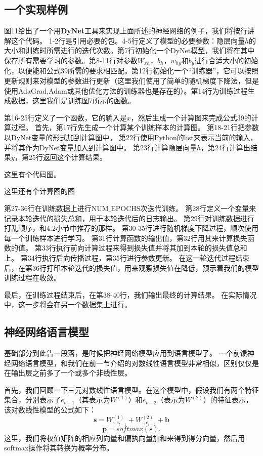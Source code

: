 \documentclass[10pt,a4paper]{ctexart}
\begin{document}
\subsection{一个实现样例}
图11给出了一个用\textbf{DyNet}工具来实现上面所述的神经网络的例子，我们将按行讲解这个代码。
1-2行是引用必要的包。4-5行定义了模型的必要参数：隐层向量\textbf{$h$}的大小和训练时所需进行的迭代次数。第7行初始化一个DyNet模型，我们将在其中保存所有需要学习的参数。第8-11行对参数$W_{xh}$，$b_h$，$w_{hy}$和$b_y$进行合适大小的初始化，以便能和公式39所需的要求相匹配。第12行初始化一个“训练器”，它可以按照更新规则来对模型的参数进行更新（这里我们使用了简单的随机梯度下降法，但是使用AdaGrad,Adam或其他优化方法的训练器也是存在的）。第14行为训练过程生成数据，这里我们是训练图7所示的函数。

第16-25行定义了一个函数，它的输入是\textbf{$x$}，然后生成一个计算图来完成公式39的计算过程。
首先，第17行先生成一个计算某个训练样本的计算图。
第18-21行把参数以DyNet变量的形式加到计算图中。
第22行使用Python的list来表示当前的输入，并将其作为DyNet变量加入到计算图中。
第23行计算隐层向量\textbf{$h$}，第24行计算出结果$y$，第25行返回这个计算结果。

这里有个代码图。

这里还有个计算图的图

第27-36行在训练数据上进行$\mathrm{NUM\_EPOCHS}$次迭代训练。
第28行定义一个变量来记录本轮迭代的损失总和，用于本轮迭代后的日志输出。
第29行对训练数据进行打乱顺序，和4.2小节中推荐的那样。
第30-35行进行随机梯度下降过程，顺次使用每一个训练样本进行学习。
第31行计算函数的输出值，第32行用其来计算损失函数的值。
第33行执行前向计算过程来得到损失值并将其加到本轮的损失值总和上。
第34行执行后向传播过程，第35行进行参数更新。
在这一轮迭代过程结束后，在第36行打印本轮迭代的损失值，用来观察损失值在降低，预示着我们的模型训练过程在收敛。

最后，在训练过程结束后，在第38-40行，我们输出最终的计算结果。
在实际情况中，这一步将会在另一个数据集上进行。

\subsection{神经网络语言模型}
基础部分到此告一段落，是时候把神经网络模型应用到语言模型了。
一个前馈神经网络语言模型，和我们在前一节介绍的对数线性语言模型非常相似，区别仅仅是在输出层之前多了一个或多个非线性层。

首先，我们回顾一下三元对数线性语言模型。在这个模型中，假设我们有两个特征集合，分别表示了$e_{t-1}$（其表示为$W^{(1)}$）和$e_{t-2}$（表示为$W^{(2)}$）的特征表示，该对数线性模型的公式如下：
\[
 \textbf{s} = W_{\cdot,e_{t-1}}^{(1)} + W_{\cdot,e_{t-2}}^{(2)} + \textbf{b}
\]
\[
 \textbf{p} = softmax( \textbf{s} ).
\]
这里，我们将权值矩阵的相应列向量和偏执向量加和来得到得分向量，然后用softmax操作将其转换为概率分布。
\end{document}

